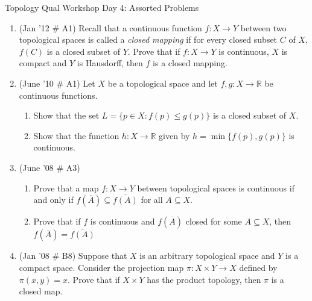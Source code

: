 \documentclass[psamsfonts, 11pt, reqno]{amsart}
\begin{document}
\newpage

\begin{center}
\begin{large}
Topology Qual Workshop Day 4: Assorted Problems
\end{large}
\end{center}
\vspace{.25in}

\begin{enumerate}

\item (Jan '12 \# A1) Recall that a continuous function $f: X \rightarrow Y$ between two topological spaces is called
a \emph{closed mapping} if for every closed subset $C$ of $X$, $f(C)$ is a closed subset of $Y$.  Prove that if
$f: X \rightarrow Y$ is continuous, $X$ is compact and $Y$ is Hausdorff, then $f$ is a closed mapping.

\vfill

\item (June '10 \# A1) Let $X$ be a topological space and let $f, g: X \rightarrow \mathbb{R}$ be continuous functions.
\begin{enumerate}
\item Show that the set $L = \{ p \in X: f(p) \leq g(p) \}$ is a closed subset of $X$.
\item Show that the function $h: X \rightarrow \mathbb{R}$ given by $h = \min \{f(p), g(p) \}$ is continuous.
\end{enumerate}
\vfill

\item (June '08 \# A3) 
\begin{enumerate}
\item Prove that a map $f: X \rightarrow Y$ between topological spaces is continuous if and only if $f(\overline{A})
\subseteq \overline{f(A)}$ for all $A \subseteq X$.
\item Prove that if $f$ is continuous and $f(\overline{A})$ closed for some $A \subseteq X$, then $f(\overline{A})
= \overline{f(A)}$ 
\end{enumerate}

\vfill

\item (Jan '08 \# B8) Suppose that $X$ is an arbitrary topological space and $Y$ is a compact space.  Consider
the projection map $\pi: X \times Y \rightarrow X$ defined by $\pi (x, y ) = x$.  Prove that if $X \times Y$ has
the product topology, then $\pi$ is a closed map.

\vfill


\end{enumerate}
\end{document}
